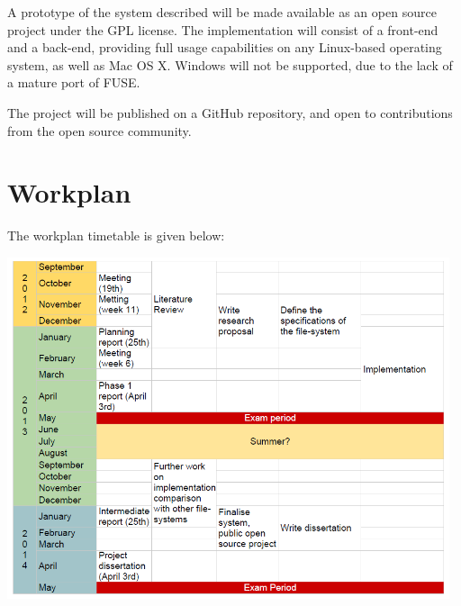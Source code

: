 \documentclass[8pt,a4paper]{article}
\begin{document}
A prototype of the system described will be made available as an open source project under the GPL \cite{gpl} license. The implementation will consist of a front-end and a back-end, providing full usage capabilities on any Linux-based operating system, as well as Mac OS X. Windows will not be supported, due to the lack of a mature port of FUSE. 

The project will be published on a GitHub \cite{github} repository, and open to contributions from the open source community.

\section{Workplan}

The workplan timetable is given below:

\begin{center}
\includegraphics[width=13cm]{timetable.png}
\end{center}
\end{document}
